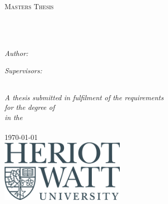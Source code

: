 \documentclass[11pt, oneside]{Thesis} %
\begin{document}
\begin{titlepage}
\begin{center}

\textsc{\LARGE \univname}\\[1.5cm] %
\textsc{\Large Masters Thesis}\\[0.5cm] %

\HRule \\[0.4cm] %
{\huge \bfseries \ttitle}\\[0.4cm] %
\HRule \\[1.5cm] %

\begin{minipage}{0.4\textwidth}
\begin{flushleft} \large
\emph{Author:}\\
\authornames
\end{flushleft}
\end{minipage}
\begin{minipage}{0.4\textwidth}
\begin{flushright} \large
\emph{Supervisors:} \\
\supname
\end{flushright}
\end{minipage}\\[3cm]

\large \textit{A thesis submitted in fulfilment of the requirements\\ for the degree of \degreename}\\[0.3cm] %
\textit{in the}\\[0.4cm]

\deptname\\[2cm] %

{\large \today}\\[1cm] %
\includegraphics[width=6cm]{./Figures/HWUlogo.jpg} %

\vfill
\end{center}

\end{titlepage}
\end{document}
